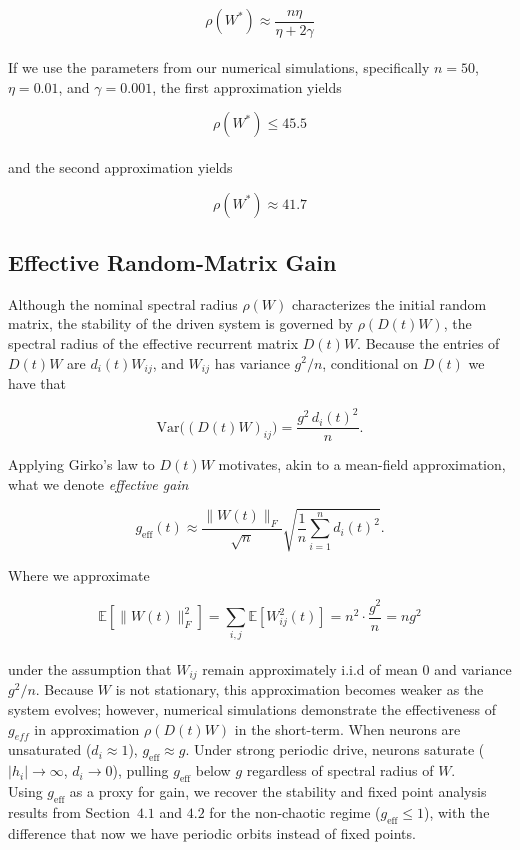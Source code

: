 \documentclass[paper=a4, fontsize=11pt]{scrartcl} %
\numberwithin{equation}{section} %
\numberwithin{figure}{section} %
\numberwithin{table}{section} %
\begin{document}
\begin{equation}
\rho(W^*) \approx \frac{n\eta}{\eta+ 2\gamma}
\end{equation}
\\
If we use the parameters from our numerical simulations, specifically $n=50$, $\eta = 0.01$, and $\gamma = 0.001$, the first approximation yields

\begin{equation}
    \rho(W^*) \le 45.5
\end{equation}
\\
and the second approximation yields

\begin{equation}
    \rho(W^*) \approx 41.7
\end{equation}

\subsection{Effective Random-Matrix Gain}
Although the nominal spectral radius $\rho(W)$ characterizes the initial random
matrix, the stability of the driven system is governed by $\rho(D(t)W)$, the
spectral radius of the effective recurrent matrix $D(t)W$.  Because the entries of
$D(t)W$ are $d_i(t) W_{ij}$, and $W_{ij}$ has variance $g^2/n$, conditional on
$D(t)$ we have that

\begin{equation}
    \mathrm{Var}\bigl((D(t)W)_{ij}\bigr) = \frac{g^2\,d_i(t)^2}{n}.
\end{equation}

Applying Girko's law to $D(t)W$ motivates, akin to a mean-field approximation, what we denote
\textit{effective gain}

\begin{equation}
    g_{\mathrm{eff}}(t) \approx \frac{\|W(t)\|_F}{\sqrt{n}}\sqrt{\frac{1}{n}\sum_{i=1}^n d_i(t)^2}.
    \label{eq:geff}
\end{equation}

Where we approximate
 
 \begin{equation}
    \mathbb{E}[\|W(t)\|^2_F] = \sum_{i,j}\mathbb{E}[W_{ij}^2(t)] = n^2 \cdot \frac{g^2}{n} = ng^2
 \end{equation}
 \\
 under the assumption that $W_{ij}$ remain approximately i.i.d of mean $0$ and variance $g^2/n$. Because $W$ is not stationary, this approximation becomes weaker as the system evolves;  however, numerical simulations demonstrate the effectiveness of $g_{eff}$ in approximation $\rho(D(t)W)$ in the short-term. When neurons are
unsaturated ($d_i \approx 1$), $g_{\mathrm{eff}} \approx g$. Under strong periodic
drive, neurons saturate ($|h_i| \to \infty$, $d_i \to 0$), pulling $g_{\mathrm{eff}}$
below $g$ regardless of spectral radius of $W$.
\vspace{0.5cm}
\\
Using $g_{\text{eff}}$ as a proxy for gain, we recover the stability and fixed point analysis results from Section~$4.1$ and $4.2$ for the non-chaotic regime ($g_{\text{eff}} \leq 1$), with the difference that now we have periodic orbits instead of fixed points.
\end{document}
